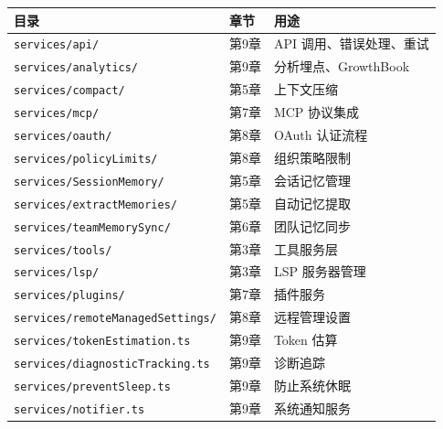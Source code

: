 {\small
\begin{longtable}{llp{6.5cm}}
\toprule
\textbf{目录} & \textbf{章节} & \textbf{用途} \\
\midrule
\endhead
\texttt{services/api/} & 第9章 & API 调用、错误处理、重试 \\
\texttt{services/analytics/} & 第9章 & 分析埋点、GrowthBook \\
\texttt{services/compact/} & 第5章 & 上下文压缩 \\
\texttt{services/mcp/} & 第7章 & MCP 协议集成 \\
\texttt{services/oauth/} & 第8章 & OAuth 认证流程 \\
\texttt{services/policyLimits/} & 第8章 & 组织策略限制 \\
\texttt{services/SessionMemory/} & 第5章 & 会话记忆管理 \\
\texttt{services/extractMemories/} & 第5章 & 自动记忆提取 \\
\texttt{services/teamMemorySync/} & 第6章 & 团队记忆同步 \\
\texttt{services/tools/} & 第3章 & 工具服务层 \\
\texttt{services/lsp/} & 第3章 & LSP 服务器管理 \\
\texttt{services/plugins/} & 第7章 & 插件服务 \\
\texttt{services/remoteManagedSettings/} & 第8章 & 远程管理设置 \\
\texttt{services/tokenEstimation.ts} & 第9章 & Token 估算 \\
\texttt{services/diagnosticTracking.ts} & 第9章 & 诊断追踪 \\
\texttt{services/preventSleep.ts} & 第9章 & 防止系统休眠 \\
\texttt{services/notifier.ts} & 第9章 & 系统通知服务 \\
\bottomrule
\end{longtable}
}
